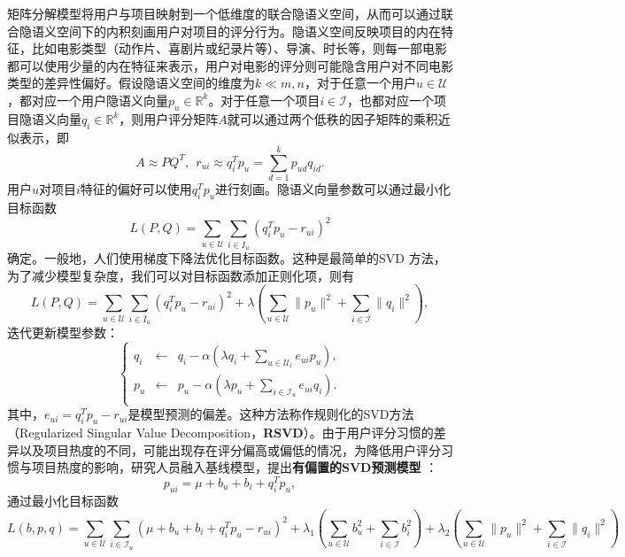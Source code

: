 矩阵分解模型将用户与项目映射到一个低维度的联合隐语义空间，从而可以通过联合隐语义空间下的内积刻画用户对项目的评分行为。隐语义空间反映项目的内在特征，比如电影类型（动作片、喜剧片或纪录片等）、导演、时长等，则每一部电影都可以使用少量的内在特征来表示，用户对电影的评分则可能隐含用户对不同电影类型的差异性偏好。假设隐语义空间的维度为$k\ll m,n$，对于任意一个用户$u\in \mathcal U$，都对应一个用户隐语义向量$p_u\in \mathbb R^k$。对于任意一个项目$i\in \mathcal I$，也都对应一个项目隐语义向量$q_i\in \mathbb R^k$，则用户评分矩阵$A$就可以通过两个低秩的因子矩阵的乘积近似表示，即
\begin{equation}
    A \approx P Q^T,~~r_{ui}\approx q_i^T p_u = \sum\limits_{d=1}^k p_{ud}q_{id}.
\end{equation}
用户$u$对项目$i$特征的偏好可以使用$q_i^T p_u$进行刻画。隐语义向量参数可以通过最小化目标函数
\begin{equation}
    L(P,Q) = \sum\limits_{u\in \mathcal U}\sum\limits_{i\in I_u} (q_i^T p_u - r_{ui})^2
\end{equation}
确定。一般地，人们使用梯度下降法优化目标函数。这种是最简单的SVD 方法，为了减少模型复杂度，我们可以对目标函数添加正则化项，则有
\begin{equation}
    L(P,Q) = \sum\limits_{u\in \mathcal U}\sum\limits_{i\in I_u} (q_i^T p_u - r_{ui})^2 + \lambda (\sum\limits_{u\in \mathcal U} \|p_u\|^2 + \sum\limits_{i\in \mathcal I} \|q_i\|^2),
\end{equation}
迭代更新模型参数：
\begin{equation}
    \left\{
        \begin{array}{lcl}
            q_i & \leftarrow & q_i - \alpha (\lambda q_i + \sum\limits_{u\in \mathcal U_i} e_{ui} p_u),\\
            p_u & \leftarrow & p_u - \alpha (\lambda p_u + \sum\limits_{i\in \mathcal I_u} e_{ui} q_i).\\
        \end{array}
    \right.
\end{equation}
其中，$e_{ui}=q_i^T p_u - r_{ui}$是模型预测的偏差。这种方法称作规则化的SVD方法（Regularized Singular Value Decomposition，\textbf{RSVD}）。由于用户评分习惯的差异以及项目热度的不同，可能出现存在评分偏高或偏低的情况，为降低用户评分习惯与项目热度的影响，研究人员融入基线模型，提出\textbf{有偏置的SVD预测模型}
\cite{koren2008factorization,koren2009bellkor,koren2011advances}：
\begin{equation}
    p_{ui} = \mu + b_u + b_i + q_i^T p_u,
\end{equation}
通过最小化目标函数
\begin{equation}
    L(b,p,q) = \sum\limits_{u\in \mathcal U}\sum\limits_{i\in \mathcal I_u} (\mu + b_u + b_i + q_i^T p_u - r_{ui})^2 + \lambda_1 (\sum\limits_{u\in \mathcal U} b_u^2 + \sum\limits_{i\in \mathcal I} b_i^2) + \lambda_2 (\sum\limits_{u\in \mathcal U} \|p_u\|^2 + \sum\limits_{i\in \mathcal I} \|q_i\|^2)
\end{equation}

